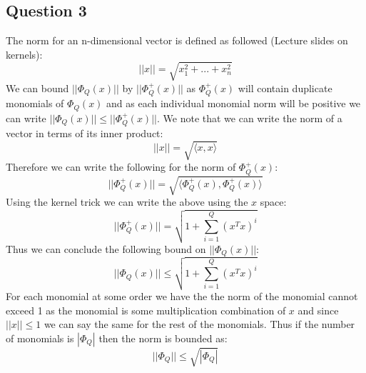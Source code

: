 \documentclass{article}
\begin{document}
\subsection{Question 3}
The norm for an n-dimensional vector is defined as followed (Lecture slides on kernels):
$$
|| x || = \sqrt{x_1^2 + ... + x_n^2}
$$
We can bound $||\Phi_Q(x)||$ by $||\Phi^+_Q(x)||$ as $\Phi^+_Q(x)$ will contain duplicate monomials of $\Phi_Q(x)$ and as each individual monomial norm will be positive we can write $||\Phi_Q(x)|| \leq ||\Phi^+_Q(x)||$. We note that we can write the norm of a vector in terms of its inner product:
\begin{equation}
||x|| = \sqrt{\langle x, x \rangle}
\end{equation}
Therefore we can write the following for the norm of $\Phi^+_Q(x)$:
\begin{equation}
||\Phi^+_Q(x)|| = \sqrt{ \langle \Phi^+_Q(x), \Phi^+_Q(x) \rangle}
\end{equation}
Using the kernel trick we can write the above using the $x$ space:
\begin{equation}
||\Phi^+_Q(x)|| = \sqrt{1+ \sum\limits_{i=1}^Q (x^Tx)^i}
\end{equation}
Thus we can conclude the following bound on $||\Phi_Q(x)||$:
\begin{equation}
||\Phi_Q(x)|| \leq \sqrt{1+ \sum\limits_{i=1}^Q (x^Tx)^i}
\end{equation}
For each monomial at some order we have the the norm of the monomial cannot exceed 1 as the monomial is some multiplication combination of $x$ and since $||x|| \leq 1$ we can say the same for the rest of the monomials. Thus if the number of monomials is $|\Phi_Q|$ then the norm is bounded as:
\begin{equation}
||\Phi_Q|| \leq \sqrt{| \Phi_Q|}
\end{equation}
\end{document}
